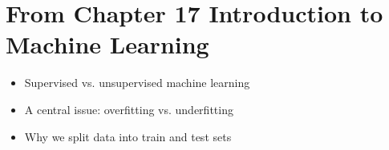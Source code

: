 \documentclass[letterpaper,10pt,english]{jupyterBook}
\begin{document}
\section{From Chapter 17 \sphinxhyphen{} Introduction to Machine Learning}
\label{\detokenize{bigpic-list:from-chapter-17-introduction-to-machine-learning}}\begin{itemize}
\item {} 
\sphinxAtStartPar
Supervised vs. unsupervised machine learning

\item {} 
\sphinxAtStartPar
A central issue: overfitting vs. underfitting

\item {} 
\sphinxAtStartPar
Why we split data into train and test sets

\end{itemize}







\renewcommand{\indexname}{Index}
\printindex
\end{document}
